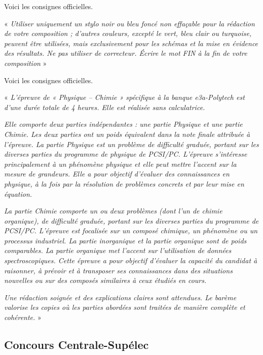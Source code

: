 \documentclass[12pt,fancy]{cours}
\begin{document}
 Voici les consignes officielles.

«\emph{
  Utiliser uniquement un stylo noir ou bleu foncé non effaçable pour la rédaction de votre composition ; d’autres
couleurs, excepté le vert, bleu clair ou turquoise, peuvent être utilisées, mais exclusivement pour les schémas
et la mise en évidence des résultats.
 Ne pas utiliser de correcteur.
 Écrire le mot FIN à la fin de votre composition
}»

 Voici les consignes officielles.

  «\emph{
  L’épreuve de « Physique – Chimie » spécifique à la banque e3a-Polytech est d’une durée totale de 4 heures. Elle est réalisée sans calculatrice.}

  \emph{
Elle comporte deux parties indépendantes : une partie Physique et une partie Chimie. Les deux parties ont un poids équivalent dans la note finale attribuée à l’épreuve.
La partie Physique est un problème de difficulté graduée, portant sur les diverses parties du programme de physique de PCSI/PC. L’épreuve s’intéresse principalement à un phénomène physique et elle peut mettre l’accent sur la mesure de grandeurs. Elle a pour objectif d’évaluer des connaissances en physique, à la fois par la résolution de problèmes concrets et par leur mise en équation.}

\emph{
La partie Chimie comporte un ou deux problèmes (dont l’un de chimie organique), de difficulté graduée, portant sur les diverses parties du programme de PCSI/PC. L’épreuve est focalisée sur un composé chimique, un phénomène ou un processus industriel. La partie inorganique et la partie organique sont de poids comparables. La partie organique met l’accent sur l’utilisation de données spectroscopiques. Cette épreuve a pour objectif d’évaluer la capacité du candidat à raisonner, à prévoir et à transposer ses connaissances dans des situations nouvelles ou sur des composés similaires à ceux étudiés en cours.
}

\emph{
Une rédaction soignée et des explications claires sont attendues. Le barème valorise les copies où les parties abordées sont traitées de manière complète et cohérente.}
  »

\subsection{Concours Centrale-Supélec}
\end{document}
